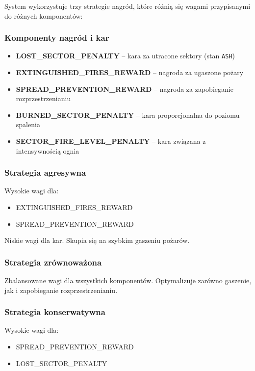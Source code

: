 \documentclass[11pt,a4paper]{article}
\begin{document}
System wykorzystuje trzy strategie nagród, które różnią się wagami przypisanymi do różnych komponentów:

\subsubsection{Komponenty nagród i kar}

\begin{itemize}
    \item \textbf{LOST\_SECTOR\_PENALTY} -- kara za utracone sektory (stan \texttt{ASH})
    \item \textbf{EXTINGUISHED\_FIRES\_REWARD} -- nagroda za ugaszone pożary
    \item \textbf{SPREAD\_PREVENTION\_REWARD} -- nagroda za zapobieganie rozprzestrzenianiu
    \item \textbf{BURNED\_SECTOR\_PENALTY} -- kara proporcjonalna do poziomu spalenia
    \item \textbf{SECTOR\_FIRE\_LEVEL\_PENALTY} -- kara związana z intensywnością ognia
\end{itemize}

\subsubsection{Strategia agresywna}

Wysokie wagi dla:
\begin{itemize}
    \item EXTINGUISHED\_FIRES\_REWARD
    \item SPREAD\_PREVENTION\_REWARD
\end{itemize}

Niskie wagi dla kar. Skupia się na szybkim gaszeniu pożarów.

\subsubsection{Strategia zrównoważona}

Zbalansowane wagi dla wszystkich komponentów. Optymalizuje zarówno gaszenie, jak i zapobieganie rozprzestrzenianiu.

\subsubsection{Strategia konserwatywna}

Wysokie wagi dla:
\begin{itemize}
    \item SPREAD\_PREVENTION\_REWARD
    \item LOST\_SECTOR\_PENALTY
\end{itemize}
\end{document}
